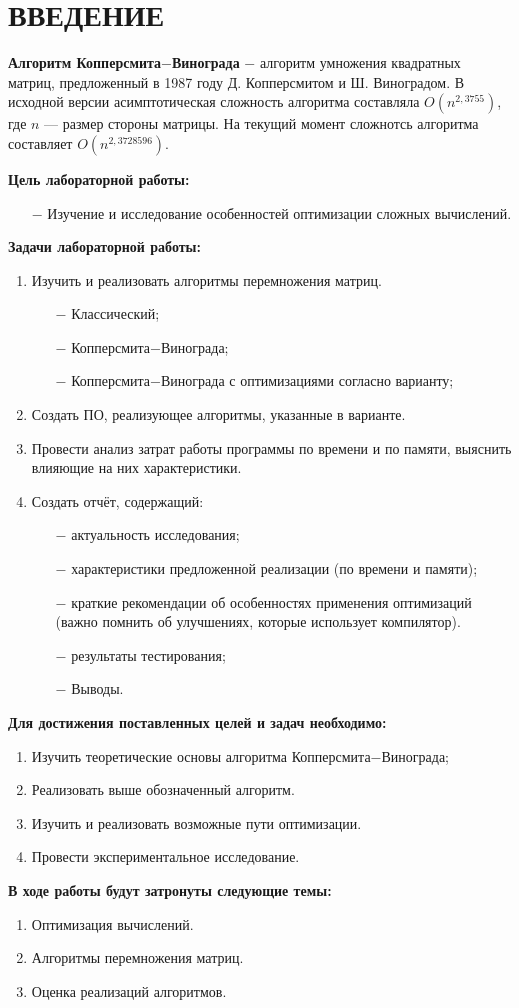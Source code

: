 \chapter*{ВВЕДЕНИЕ}

\textbf{Алгоритм Копперсмита$-$Винограда}\cite{winograd} $-$ алгоритм умножения квадратных матриц, предложенный в 1987 году Д. Копперсмитом и Ш. Виноградом.
В исходной версии асимптотическая сложность алгоритма составляла $O(n^{2,3755})$, где  $n$ — размер стороны матрицы.
На текущий момент сложнотсь алгоритма составляет $O(n^{2,3728596})$.

\textbf{Цель лабораторной работы:}
\begin{itemize}
    \item[$-$] Изучение и исследование особенностей оптимизации сложных вычислений.
\end{itemize}

\textbf{Задачи лабораторной работы:}
\begin{enumerate}
\item Изучить и реализовать алгоритмы перемножения матриц.
\begin{enumerate}
    \item[$-$] Классический;
    \item[$-$] Копперсмита$-$Винограда;
    \item[$-$] Копперсмита$-$Винограда с оптимизациями согласно варианту;
\end{enumerate}
\item Создать ПО, реализующее алгоритмы, указанные в варианте.
\item Провести анализ затрат работы программы по времени и по памяти, выяснить влияющие на них характеристики.
    \item Создать отчёт, содержащий:
    \begin{enumerate}
        \item[$-$] актуальность исследования;
        \item[$-$] характеристики предложенной реализации (по времени и памяти);
        \item[$-$] краткие рекомендации об особенностях применения оптимизаций (важно помнить об улучшениях, которые использует компилятор).
        \item[$-$] результаты тестирования;
        \item[$-$] Выводы.
    \end{enumerate}
\end{enumerate}
\newpage
\textbf{Для достижения поставленных целей и задач необходимо:}
\begin{enumerate}
    \item Изучить теоретические основы алгоритма Копперсмита$-$Винограда;
    \item Реализовать выше обозначенный алгоритм.
    \item Изучить и реализовать возможные пути оптимизации.
    \item Провести экспериментальное исследование.
\end{enumerate}

\textbf{В ходе работы будут затронуты следующие темы:}
\begin{enumerate}
\item Оптимизация вычислений.
\item Алгоритмы перемножения матриц.
\item Оценка реализаций алгоритмов.
\end{enumerate}

